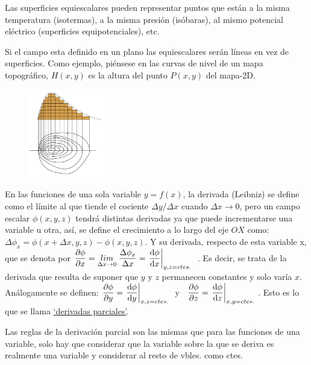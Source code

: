 \begin{multicols}{2}
Las superficies equiescalares pueden representar puntos que están a la misma temperatura (isotermas), a la misma presión (isóbaras), al mismo potencial eléctrico (superficies equipotenciales), etc.

\footnotesize{Si el campo esta definido en un plano las equiescalares serán líneas en vez de superficies. Como ejemplo, piénsese en las curvas de nivel de un mapa topográfico, $H(x,y)$ es la altura del punto $P(x,y)$ del mapa-2D}.

	\begin{figure}[H]
	\centering
	\includegraphics[width=0.3\textwidth]{imagenes/imagenes10/T10IM19.png}
	\end{figure}
\end{multicols}
\normalsize
En las funciones de una sola variable $y=f(x)$, la derivada (Leibniz) se define como el límite al que tiende el cociente $\Delta y / \Delta x$ cuando $\Delta x \to 0$, pero  un campo escalar $\phi (x,y,z)$ tendrá distintas derivadas ya que puede incrementarse una variable u otra, así, se define el crecimiento a lo largo del eje $OX$ como: $\Delta \phi_x =\phi (x+\Delta x, y, z)- \phi(x,y,z)$. Y su derivada, respecto de esta variable x, que se denota por $\dfrac{\partial \phi}{\partial x} = \underset {\Delta x \to 0}{lim}\;{\dfrac {\Delta \phi_x}{\Delta x}}= \eval {\dfrac {\dd \phi}{\dd x}}_{y,z=ctes.}\; \; $. Es decir, se trata de la derivada que resulta de suponer que $y$ y $z$ permanecen constantes y solo varía $x$. Análogamente se definen: $\dfrac{\partial \phi}{\partial y}=\eval {\dfrac {\dd \phi}{\dd y}}_{x,z=ctes.}\; $ y $\; \; \dfrac{\partial \phi}{\partial z}=\eval {\dfrac {\dd \phi}{\dd z}}_{x,y=ctes.}\; $. Esto es lo que se llama \underline{`derivadas parciales'}.

Las reglas de la derivación parcial son las mismas que para las funciones de una variable, solo hay que considerar que la variable sobre la que se deriva es realmente una variable y considerar al resto de vbles. como ctes.

